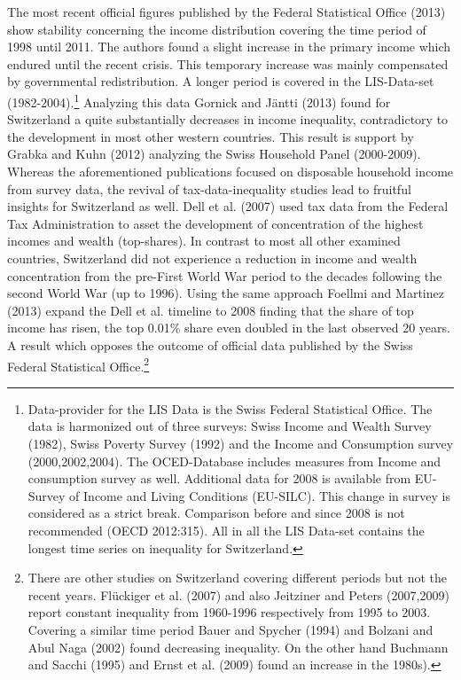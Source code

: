\documentclass[twoside]{article}
\begin{document}
\begin{multicols}{2}
The most recent official figures published by the Federal Statistical Office (2013) show  stability concerning the income distribution covering the time period of 1998 until 2011. The authors found a slight increase in the primary income which endured until the recent crisis. This temporary increase was mainly compensated by governmental redistribution. A longer period is covered in the LIS-Data-set (1982-2004).\footnote{Data-provider for the LIS Data is the Swiss Federal Statistical Office. The data is harmonized out of three surveys: Swiss Income and Wealth Survey (1982), Swiss Poverty Survey (1992) and the Income and Consumption survey (2000,2002,2004). The OCED-Database includes measures from Income and consumption survey as well. Additional data for 2008 is available from EU-Survey of Income and Living Conditions (EU-SILC). This change in survey is considered as a strict break. Comparison before and since 2008 is not recommended (OECD 2012:315). All in all the LIS Data-set contains the longest time series on inequality for Switzerland.} Analyzing this data Gornick and Jäntti (2013) found for Switzerland a quite substantially decreases in income inequality, contradictory to the development in most other western countries. This result is support by Grabka and Kuhn (2012) analyzing the Swiss Household Panel (2000-2009). \\


Whereas the aforementioned publications focused on disposable household income from survey data, the revival of tax-data-inequality studies lead to fruitful insights for Switzerland as well. Dell et al. (2007) used tax data from the Federal Tax Administration to asset the development of concentration of the highest incomes and wealth (top-shares). In contrast to most all other examined countries, Switzerland did not experience a reduction in income and wealth concentration from the pre-First World War period to the decades following the second World War (up to 1996). Using the same approach Foellmi and Martinez (2013) expand the Dell et al. timeline to 2008 finding that the share of top income has risen, the top 0.01\% share even doubled in the last observed 20 years. A result which opposes the outcome of official data published by the Swiss Federal Statistical Office.\footnote{There are other studies on Switzerland covering different periods but not the recent years. Flückiger et al. (2007) and also Jeitziner and Peters (2007,2009) report constant inequality from 1960-1996 respectively from 1995 to 2003. Covering a similar time period Bauer and Spycher (1994) and Bolzani and Abul Naga (2002) found decreasing inequality. On the other hand Buchmann and Sacchi (1995) and Ernst et al. (2009) found an increase in the 1980s).} \\



\end{multicols}
\end{document}
